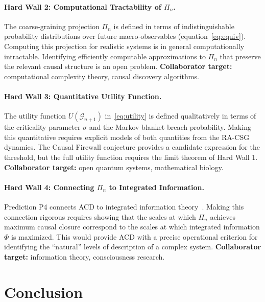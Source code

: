 \documentclass[11pt,a4paper]{article}
\theoremstyle{remark}
\newcommand{\GG}{\mathcal{G}}
\newcommand{\sigmaedge}{\sigma}
\begin{document}
\paragraph{Hard Wall 2: Computational Tractability of $\Pi_n$.}
The coarse-graining projection $\Pi_n$ is defined in terms of indistinguishable
probability distributions over future macro-observables (equation~\eqref{eq:equiv}).
Computing this projection for realistic systems is in general computationally
intractable. Identifying efficiently computable approximations to $\Pi_n$ that
preserve the relevant causal structure is an open problem. \textbf{Collaborator
target:} computational complexity theory, causal discovery algorithms.

\paragraph{Hard Wall 3: Quantitative Utility Function.}
The utility function $U(\GG_{n+1})$ in~\eqref{eq:utility} is defined qualitatively
in terms of the criticality parameter $\sigmaedge$ and the Markov blanket breach
probability. Making this quantitative requires explicit models of both quantities
from the RA-CSG dynamics. The Causal Firewall conjecture provides a candidate
expression for the threshold, but the full utility function requires the limit
theorem of Hard Wall 1. \textbf{Collaborator target:} open quantum systems,
mathematical biology.

\paragraph{Hard Wall 4: Connecting $\Pi_n$ to Integrated Information.}
Prediction P4 connects ACD to integrated information theory~\citep{Tononi2004}.
Making this connection rigorous requires showing that the scales at which
$\Pi_n$ achieves maximum causal closure correspond to the scales at which
integrated information $\Phi$ is maximized. This would provide ACD with a
precise operational criterion for identifying the ``natural'' levels of
description of a complex system. \textbf{Collaborator target:} information
theory, consciousness research.

\section{Conclusion}
\label{sec:conclusion}
\end{document}

